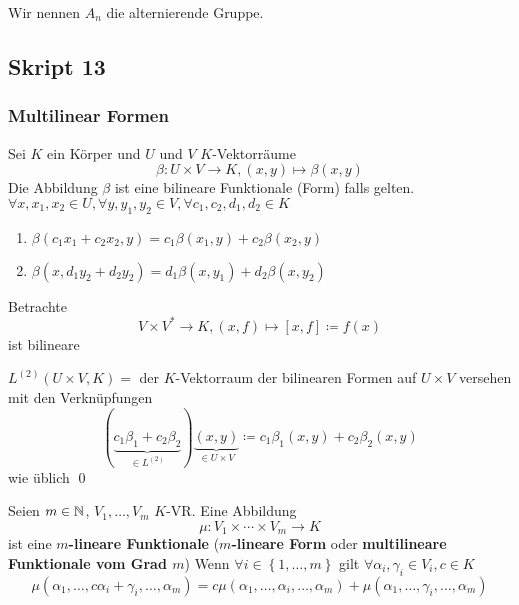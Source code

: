 \begin{subdefinition}
	Wir nennen $ A_n $ die alternierende Gruppe.
\end{subdefinition}

\subsection{Skript 13}
\setcounter{subsubsection}{6}
\subsubsection{Multilinear Formen}

Sei $ K $ ein Körper und $ U $ und $ V $ $ K $-Vektorräume
\[
	\beta : U \times V \to K, (x, y) \mapsto \beta(x, y)
\]
Die Abbildung $ \beta $ ist eine bilineare Funktionale (Form) falls gelten.\\
$ \forall x, x_1, x_2 \in U, \forall y, y_1, y_2 \in V, \forall c_1, c_2, d_1, d_2 \in K $
\begin{enumerate}[label=(\arabic*)]
	\item $ \beta(c_1x_1 + c_2x_2, y) = c_1 \beta(x_1, y) + c_2 \beta(x_2, y)  $
	\item $ \beta(x, d_1 y_2 + d_2 y_2) = d_1 \beta(x, y_1) + d_2 \beta(x, y_2)  $
\end{enumerate}

\setcounter{subenvironmentnumber}{1}
\begin{subexample}
	Betrachte
	\[
		V \times V^* \to K, (x, f) \mapsto [x, f] \coloneqq f(x)
	\]
	ist bilineare
\end{subexample}

\begin{subdefinition*}[Notation]
	$ L^{(2)} \left( U \times V, K \right) = $ der $ K $-Vektorraum der bilinearen Formen auf $ U \times V $ versehen mit den Verknüpfungen
	\[
		( \underbrace{c_1 \beta_1 + c_2 \beta_2}_{\in L^{(2)} } ) \underbrace{(x, y)}_{\in U \times V} \coloneqq c_1 \beta_1 (x, y) + c_2 \beta_2 (x, y)
	\]
	wie üblich \qed
\end{subdefinition*}

\begin{subdefinition}
	Seien $ m \in \mathbb{N}  $, $ V_1, \dotsc, V_m $ $ K $-VR.
	Eine Abbildung
	\[
		\mu: V_1 \times \dotsb \times V_m \to K
	\]
	ist eine \textbf{$ m $-lineare Funktionale} (\textbf{$ m $-lineare Form} oder \textbf{multilineare Funktionale vom Grad $ m $})
	Wenn $ \forall i \in \left\{ 1, \dotsc, m \right\}  $ gilt $ \forall \alpha_i, \gamma_i \in V_i, c \in K $
	\[
		\mu (\alpha_1, \dotsc, c\alpha_i + \gamma_i, \dotsc, \alpha_m) = c \mu(\alpha_1, \dotsc, \alpha_i, \dotsc, \alpha_m) + \mu(\alpha_1, \dotsc, \gamma_i, \dotsc, \alpha_m)
	\]
\end{subdefinition}


